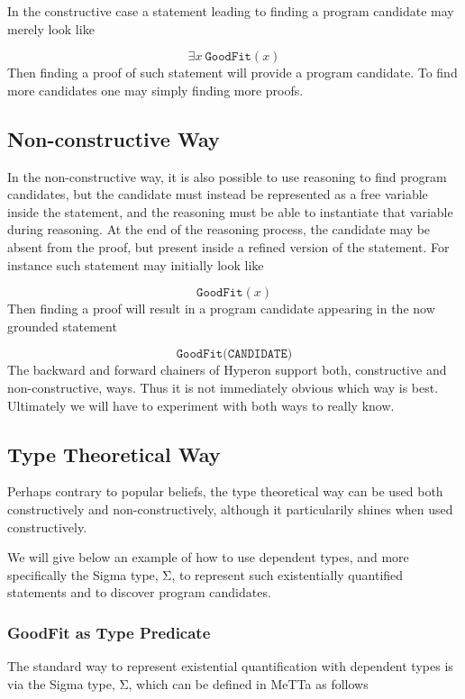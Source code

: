 \documentclass[]{report}
\begin{document}
In the constructive case a statement leading to finding a program
candidate may merely look like

$$\exists x\ \texttt{GoodFit}(x)$$
Then finding a proof of such statement will provide a program
candidate.  To find more candidates one may simply finding more
proofs.

\subsection{Non-constructive Way}

In the non-constructive way, it is also possible to use reasoning to
find program candidates, but the candidate must instead be represented
as a free variable inside the statement, and the reasoning must be
able to instantiate that variable during reasoning.  At the end of the
reasoning process, the candidate may be absent from the proof, but
present inside a refined version of the statement.  For instance such
statement may initially look like

$$\texttt{GoodFit}(x)$$
Then finding a proof will result in a program candidate appearing in
the now grounded statement

$$\texttt{GoodFit(CANDIDATE)}$$
The backward and forward chainers of Hyperon support both,
constructive and non-constructive, ways.  Thus it is not immediately
obvious which way is best.  Ultimately we will have to experiment with
both ways to really know.

\subsection{Type Theoretical Way}
Perhaps contrary to popular beliefs, the type theoretical way can be
used both constructively and non-constructively, although it
particularily shines when used constructively.

We will give below an example of how to use dependent types, and more
specifically the Sigma type, Σ, to represent such existentially
quantified statements and to discover program candidates.

\subsubsection{GoodFit as Type Predicate}

The standard way to represent existential quantification with
dependent types is via the Sigma type, Σ, which can be defined in
MeTTa as follows
\end{document}
